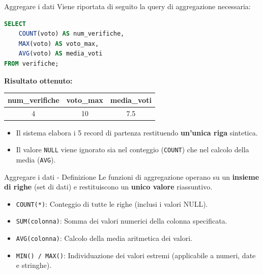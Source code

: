 \documentclass{beamer}
\begin{document}
\begin{frame}[fragile]{Aggregare i dati}
Viene riportata di seguito la query di aggregazione necessaria:

\begin{lstlisting}[language=SQL]
SELECT 
    COUNT(voto) AS num_verifiche,
    MAX(voto) AS voto_max,
    AVG(voto) AS media_voti
FROM verifiche;
\end{lstlisting}

\textbf{Risultato ottenuto:}
\begin{center}
\begin{tabular}{|c|c|c|}
\hline
\textbf{num\_verifiche} & \textbf{voto\_max} & \textbf{media\_voti} \\ \hline
4 & 10 & 7.5 \\ \hline
\end{tabular}
\end{center}

\begin{itemize}
    \item Il sistema elabora i 5 record di partenza restituendo \textbf{un'unica riga} sintetica.
    \item Il valore \texttt{NULL} viene ignorato sia nel conteggio (\texttt{COUNT}) che nel calcolo della media (\texttt{AVG}).
\end{itemize}
\end{frame}

\begin{frame}[fragile]{Aggregare i dati - Definizione}
Le funzioni di aggregazione operano su un \textbf{insieme di righe} (set di dati) e restituiscono un \textbf{unico valore} riassuntivo.

\begin{itemize}
    \item \texttt{COUNT(*)}: Conteggio di tutte le righe (inclusi i valori NULL).
    \item \texttt{SUM(colonna)}: Somma dei valori numerici della colonna specificata.
    \item \texttt{AVG(colonna)}: Calcolo della media aritmetica dei valori.
    \item \texttt{MIN() / MAX()}: Individuazione dei valori estremi (applicabile a numeri, date e stringhe).
\end{itemize}

\end{frame}
\end{document}
